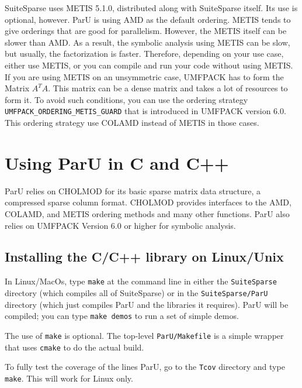 \documentclass[12pt]{article}
\begin{document}
SuiteSparse uses METIS 5.1.0, distributed along with SuiteSparse itself.
Its use is optional, however. ParU is using AMD as the default ordering. METIS
tends to give orderings that are good for parallelism. However, the METIS itself
can be slower than AMD. As a result, the symbolic analysis using METIS can be slow, but
usually, the factorization is faster. Therefore, depending on your use case,
either use METIS, or you can compile and run your code without using METIS.
If you are using METIS on an unsymmetric case, UMFPACK has to form the Matrix
$A^{T}A$. This matrix can be a dense matrix and takes a lot of resources to form
it. To avoid such conditions, you can use the ordering strategy
\verb'UMFPACK_ORDERING_METIS_GUARD' that is introduced in UMFPACK version 6.0.
This ordering strategy use COLAMD instead of METIS in those cases.

\section{Using ParU in C and C++}

ParU relies on CHOLMOD for its basic sparse matrix data structure, a compressed 
sparse column format.  CHOLMOD provides interfaces to the AMD, COLAMD, and METIS
ordering methods and many other functions. ParU also relies on UMFPACK Version 
6.0 or higher for symbolic analysis. 


\subsection{Installing the C/C++ library on Linux/Unix}
In Linux/MacOs, type \verb'make' at the command line in either the 
\verb'SuiteSparse' directory (which compiles all of SuiteSparse) or in the 
\verb'SuiteSparse/ParU' directory (which just compiles ParU and the libraries 
it requires).  ParU will be compiled; you can type \verb'make demos' to run a
set of simple demos.

The use of \verb'make' is optional.  The top-level \verb'ParU/Makefile' is
a simple wrapper that uses \verb'cmake' to do the actual build.

To fully test the coverage of the lines ParU, go to the \verb'Tcov'
directory and type \verb'make'.  This will work for Linux only.
\end{document}
